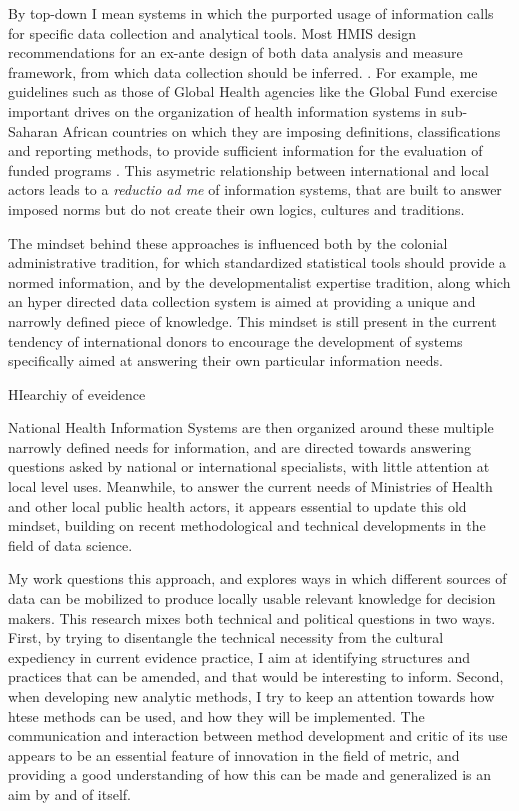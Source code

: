 By top-down I mean systems in which the purported usage of information calls for specific data collection and analytical tools. Most HMIS design recommendations for an ex-ante design of both data analysis and measure framework, from which data collection should be inferred. \citep{lippeveld_routine_2000,rhino_introducing_2003,daltilia_systeme_2005,health_metrics_network_framework_2008}. For example, \gls{me} guidelines such as those of Global Health agencies like the Global Fund exercise important drives on the organization of health information systems in sub-Saharan African countries on which they are imposing definitions, classifications and reporting methods, to provide sufficient information for the evaluation of funded programs \citep{the_global_fund_global_2014}. This asymetric relationship between international and local actors leads to a    \textit{reductio ad \gls{me}} of information systems, that are built to answer imposed norms but do not create their own logics, cultures and traditions.

The mindset behind these approaches is influenced both by the colonial administrative tradition, for which standardized statistical tools should provide a normed information, and by the developmentalist expertise tradition, along which an hyper directed data collection system is aimed at providing a unique and narrowly defined piece of knowledge. This mindset is still present in the current tendency of international donors to encourage the development of systems specifically aimed at answering their own particular information needs.


HIearchiy of eveidence

National Health Information Systems are then organized around these multiple narrowly defined needs for information, and are directed towards answering questions asked by national or international specialists, with little attention at local level uses. Meanwhile, to answer the current needs of Ministries of Health and other local public health actors, it appears essential to update this old mindset, building on recent methodological and technical developments in the field of data science.

My work questions this approach, and explores ways in which different sources of data can be mobilized to produce locally usable relevant knowledge for decision makers. This research mixes both technical and political questions in two ways. First, by trying to disentangle the technical necessity from the cultural expediency in current evidence practice, I aim at identifying structures and practices that can be amended, and that would be interesting to inform. Second, when developing new analytic methods, I try to keep an attention towards how htese methods can be used, and how they will be implemented. The communication and interaction between method development and critic of its use appears to be an essential feature of innovation in the field of metric, and providing a good understanding of how this can be made and generalized is an aim by and of itself.

